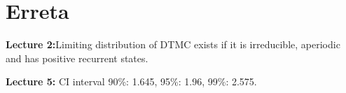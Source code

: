 \section{Erreta}
\textbf{Lecture 2:}Limiting distribution of DTMC exists if it is irreducible, aperiodic and has positive recurrent states.

\textbf{Lecture 5:} CI interval 90\%: 1.645, 95\%: 1.96, 99\%: 2.575.
\\~\\~\\~\\~\\~\\~\\~\\~\\